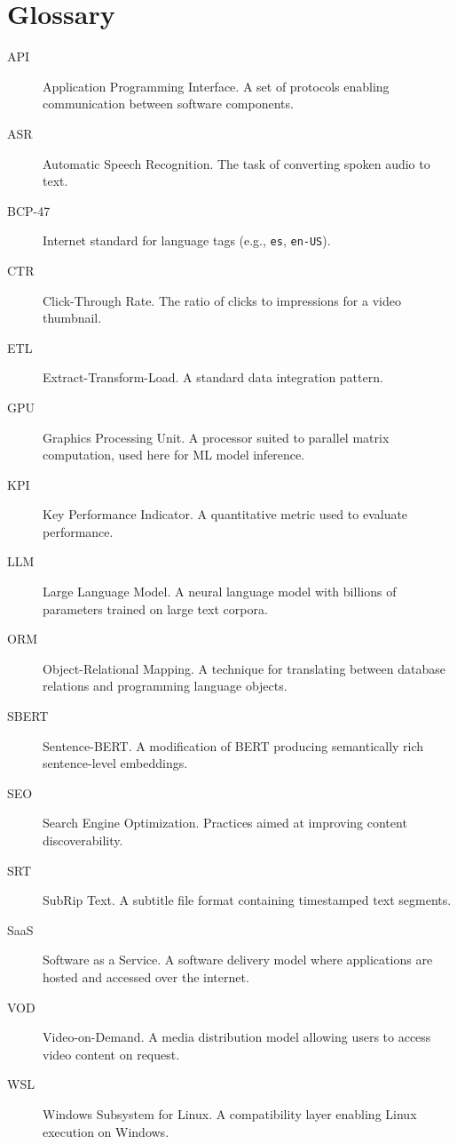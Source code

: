 \documentclass[ENG]{TFUOC}
\begin{document}
\chapter{Glossary}

\begin{description}
\item[API] Application Programming Interface. A set of protocols enabling communication between software components.
\item[ASR] Automatic Speech Recognition. The task of converting spoken audio to text.
\item[BCP-47] Internet standard for language tags (e.g., \texttt{es}, \texttt{en-US}).
\item[CTR] Click-Through Rate. The ratio of clicks to impressions for a video thumbnail.
\item[ETL] Extract-Transform-Load. A standard data integration pattern.
\item[GPU] Graphics Processing Unit. A processor suited to parallel matrix computation, used here for ML model inference.
\item[KPI] Key Performance Indicator. A quantitative metric used to evaluate performance.
\item[LLM] Large Language Model. A neural language model with billions of parameters trained on large text corpora.
\item[ORM] Object-Relational Mapping. A technique for translating between database relations and programming language objects.
\item[SBERT] Sentence-BERT. A modification of BERT producing semantically rich sentence-level embeddings.
\item[SEO] Search Engine Optimization. Practices aimed at improving content discoverability.
\item[SRT] SubRip Text. A subtitle file format containing timestamped text segments.
\item[SaaS] Software as a Service. A software delivery model where applications are hosted and accessed over the internet.
\item[VOD] Video-on-Demand. A media distribution model allowing users to access video content on request.
\item[WSL] Windows Subsystem for Linux. A compatibility layer enabling Linux execution on Windows.
\end{description}





\newpage
\appendix
\end{document}
